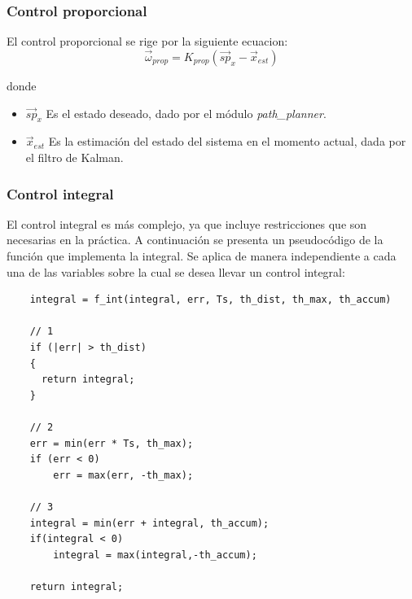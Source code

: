 \documentclass[main]{subfiles}
\begin{document}
\subsubsection{Control proporcional}
\label{sec:software:control-prop}


El control proporcional se rige por la siguiente ecuacion:
\begin{equation}
  \label{eq:software:prop}
  \vec{\omega}_{prop} = K_{prop} (\vec{sp}_x - \vec{x}_{est})
\end{equation}

donde
\begin{itemize}
\item $\vec{sp}_x$ Es el estado deseado, dado por el m\'odulo \textit{path\_planner}.
\item $\vec{x}_{est}$ Es la estimaci\'on del estado del sistema en el momento actual, dada por el filtro de Kalman.
\end{itemize}

\subsubsection{Control integral}
\label{sec:software:control-int}

El control integral es m\'as complejo, ya que incluye restricciones que son necesarias en la pr\'actica. A continuaci\'on se presenta un pseudoc\'odigo de la funci\'on que implementa la integral. Se aplica de manera independiente a cada una de las variables sobre la cual se desea llevar un control integral:
\begin{verbatim}
    integral = f_int(integral, err, Ts, th_dist, th_max, th_accum)

    // 1
    if (|err| > th_dist)
    {
      return integral;
    }

    // 2
    err = min(err * Ts, th_max);
    if (err < 0)
        err = max(err, -th_max);

    // 3
    integral = min(err + integral, th_accum);
    if(integral < 0)
        integral = max(integral,-th_accum);

    return integral;
\end{verbatim}
\end{document}
